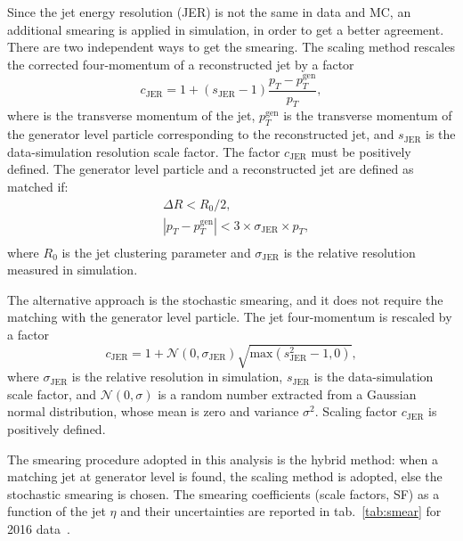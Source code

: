 \noindent Since the jet energy resolution (JER) is not the same in data and MC, an additional smearing is applied in simulation, in order to get a better agreement. There are two independent ways to get the smearing. The scaling method rescales the corrected four-momentum of a reconstructed jet by a factor
\begin{equation}
c_{\text{JER}} = 1 + (s_{\text{JER}} - 1) \frac{p_T - p_T^{\text{gen}}}{p_T},
\end{equation}
where \pt is the transverse momentum of the jet, $p_T^{\text{gen}}$ is the transverse momentum of the generator level particle corresponding to the reconstructed jet, and $s_{\text{JER}}$ is the data-simulation resolution scale factor. The factor $c_{\text{JER}}$ must be positively defined. %
The generator level particle and a reconstructed jet are defined as matched if:
\begin{equation}
\begin{split}
& \Delta R < R_{0} / 2, \\
&  |p_T - p_T^{\text{gen}}| < 3 \times \sigma_{\text{JER}} \times p_{T}, \\
\end{split}
\end{equation}
where $R_{0}$ is the jet clustering parameter and $\sigma_{\text{JER}}$ is the relative \pt resolution measured in simulation.

\noindent The alternative approach is the stochastic smearing, and it does not require the matching with the generator level particle. The jet four-momentum is rescaled by a factor
\begin{equation}
c_{\text{JER}} = 1 + \mathcal{N}(0, \sigma_{\text{JER}}) \sqrt{\text{max}(s_{\text{JER}}^2 - 1, 0)},
\end{equation}
where $\sigma_{\text{JER}}$ is the relative \pt resolution in simulation, $s_{\text{JER}}$ is the data-simulation scale factor, and $\mathcal{N}(0, \sigma)$ 
is a random number extracted from a Gaussian normal distribution, whose mean is zero and variance $\sigma^2$. Scaling factor $c_{\text{JER}}$ is positively defined.%

\noindent The smearing procedure adopted in this analysis is the hybrid method: when a matching jet at generator level is found, the scaling method is adopted, else the stochastic smearing is chosen. The smearing coefficients (scale factors, SF) as a function of the jet $\eta$ and their uncertainties are reported in tab.~\ref{tab:smear} for 2016 data~\cite{CMS-DP-2016-020}.

